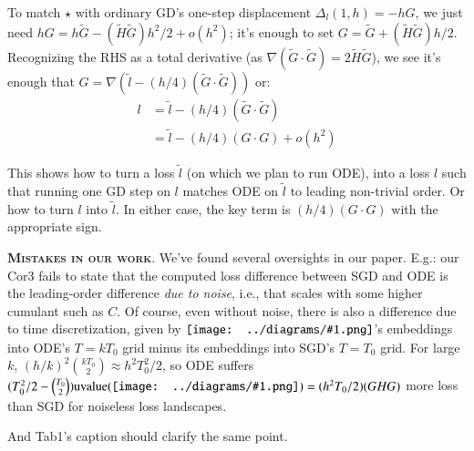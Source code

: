 \documentclass[12pt]{article}
\newcommand{\cor}[1]{\textmd{{\color{gray}Cor}{#1}}}
\newcommand{\tab}[1]{\textmd{{\color{gray}Tab}{#1}}}
\newcommand{\cit}[1]{[\textbf{#1}]}
\newcommand{\moosect}[1]{\par\noindent\hspace{-1cm}\textsc{\textbf{#1}}.}
\newcommand{\sizeddia}[2]{%
    \begin{gathered}%
        \texttt{[image: ../diagrams/\#1.png]}%
    \end{gathered}%
}
\newcommand{\mdia}[1]{\protect \sizeddia{#1}{0.14}}
\begin{document}
    To match $\star$ with ordinary GD's one-step displacement $\Delta_l(1,h)
    = -hG$, we just need $hG = h\tilde{G} - (\tilde H \tilde G) h^2/2 + o(h^2)$;
    it's enough to set $G=\tilde{G}+(\tilde H \tilde G) h/2$.  Recognizing
    the RHS as a total derivative (as $\nabla(\tilde G\cdot \tilde
    G) = 2\tilde{H}\tilde{G}$), we see it's enough that $G = \nabla(\tilde l - (h/4) (\tilde G\cdot \tilde G))$ or:
    \begin{align*}
        l &= \tilde l - (h/4) (\tilde G\cdot \tilde G) \\
          &= \tilde l - (h/4) (G\cdot G) + o(h^2)
    \end{align*}

    This shows how to turn a loss $\tilde l$ (on which we plan to run ODE),
    into a loss $l$ such that running one GD step on $l$ matches ODE on $\tilde
    l$ to leading non-trivial order.  Or how to turn
    $l$ into $\tilde l$.  In either case, the key term is $(h/4) (G\cdot G)$ with
    the appropriate sign.

\moosect{Mistakes in our work}
    We've found several oversights in our paper.
    E.g.: our \cor{3} fails to state that the computed loss difference
    between SGD and ODE is the leading-order difference \emph{due to noise},
    i.e., that scales with some higher cumulant such as $C$.  Of course, even
    without noise, there is also a difference due to time discretization, given
    by $\mdia{c(0-1-2)(01-12)}$'s embeddings into ODE's $T=kT_0$ grid minus
    its embeddings into SGD's $T=T_0$ grid.  For large $k$, $(h/k)^2
    {kT_0\choose 2}\approx h^2T_0^2/2$, so ODE suffers $(T_0^2/2 - {T_0\choose
    2}) \text{uvalue}(\mdia{c(0-1-2)(01-12)}) = (h^2 T_0/2)(GHG)$ more loss
    than SGD for noiseless loss landscapes.

    And \tab{1}'s caption should clarify the same point. 

\end{document}
